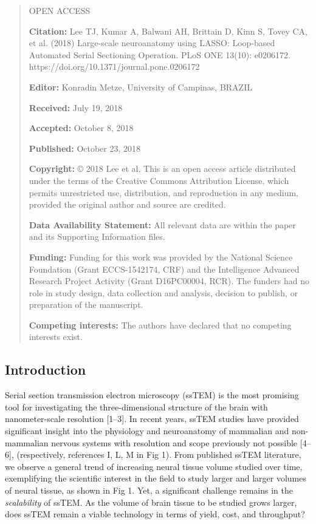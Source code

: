\documentclass{article}
\begin{document}
\begin{quote}\small
\noindent OPEN ACCESS

\noindent\textbf{Citation:} Lee TJ, Kumar A, Balwani AH, Brittain D, Kinn S, Tovey CA, et al. (2018) Large-scale neuroanatomy using LASSO: Loop-based Automated Serial Sectioning Operation. PLoS ONE 13(10): e0206172. https://doi.org/10.1371/journal.pone.0206172

\noindent\textbf{Editor:} Konradin Metze, University of Campinas, BRAZIL

\noindent\textbf{Received:} July 19, 2018

\noindent\textbf{Accepted:} October 8, 2018

\noindent\textbf{Published:} October 23, 2018

\noindent\textbf{Copyright:} © 2018 Lee et al. This is an open access article distributed under the terms of the Creative Commons Attribution License, which permits unrestricted use, distribution, and reproduction in any medium, provided the original author and source are credited.

\noindent\textbf{Data Availability Statement:} All relevant data are within the paper and its Supporting Information files.

\noindent\textbf{Funding:} Funding for this work was provided by the National Science Foundation (Grant ECCS-1542174, CRF) and the Intelligence Advanced Research Project Activity (Grant D16PC00004, RCR). The funders had no role in study design, data collection and analysis, decision to publish, or preparation of the manuscript.

\noindent\textbf{Competing interests:} The authors have declared that no competing interests exist.
\end{quote}

\subsection*{Introduction}

Serial section transmission electron microscopy (ssTEM) is the most promising tool for investigating the three-dimensional structure of the brain with nanometer-scale resolution [1–3]. In recent years, ssTEM studies have provided significant insight into the physiology and neuroanatomy of mammalian and non-mammalian nervous systems with resolution and scope previously not possible [4–6], (respectively, references I, L, M in Fig 1). From published ssTEM literature, we observe a general trend of increasing neural tissue volume studied over time, exemplifying the scientific interest in the field to study larger and larger volumes of neural tissue, as shown in Fig 1. Yet, a significant challenge remains in the \emph{scalability} of ssTEM. As the volume of brain tissue to be studied grows larger, does ssTEM remain a viable technology in terms of yield, cost, and throughput?
\end{document}
